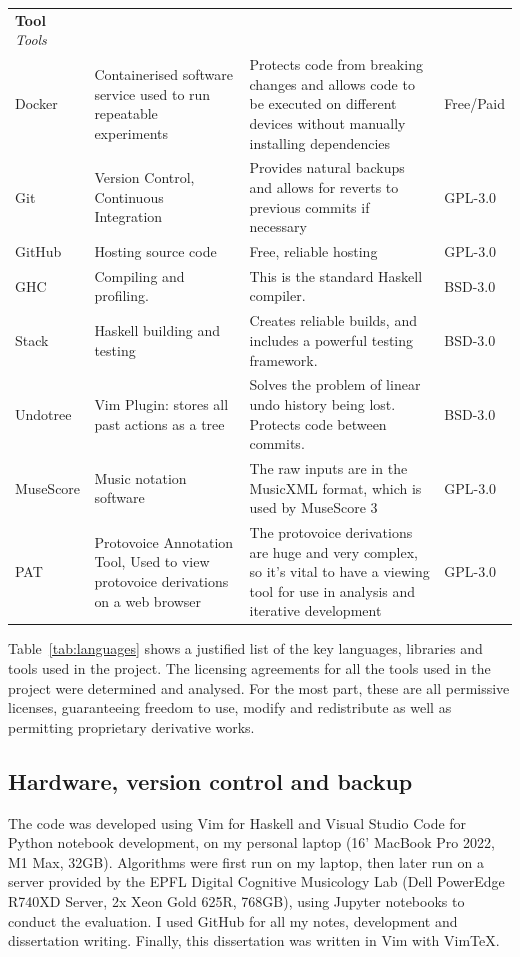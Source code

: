 \documentclass[12pt,a4paper,twoside,openany]{report} \usepackage[pdfborder={0 0 0}]{hyperref}    %
\theoremstyle{definition} \newtheorem{definition}{Definition}[section]
\begin{document}
\begin{table}[ht!]
\begin{tabularx}{\textwidth}{p{4em}X X p{4em}} {\normalsize \textbf{Tool}}
        \textit{Tools} &&&\\ Docker & Containerised software service used to run repeatable experiments
                       & Protects code from breaking changes and allows code to be executed on
        different devices without manually installing dependencies & Free/Paid \\ Git & Version Control, Continuous Integration & Provides natural backups and
        allows for reverts to previous commits if necessary & GPL-3.0 \\ GitHub & Hosting source code & Free, reliable
        hosting & GPL-3.0 \\ GHC & Compiling and profiling. & This is the standard Haskell compiler. & BSD-3.0 \\ Stack
                & Haskell building and testing  & Creates reliable builds, and includes a powerful testing framework.
                & BSD-3.0 \\ Undotree & Vim Plugin: stores all past actions as a tree & Solves the problem of linear
        undo history being lost. Protects code between commits. & BSD-3.0 \\ MuseScore & Music notation software & The
        raw inputs are in the MusicXML format, which is used by MuseScore 3 & GPL-3.0 \\ PAT & Protovoice Annotation
        Tool, Used to view protovoice derivations on a web browser & The protovoice derivations are huge and very
      complex, so it's vital to have a viewing tool for use in analysis and iterative development & GPL-3.0 \\
    \end{tabularx} 
  \end{table}

    Table~\ref{tab:languages} shows a justified list of the key languages, libraries and tools used in the project. The
    licensing agreements for all the tools used in the project were determined and analysed. For the most part, these
    are all permissive licenses, guaranteeing freedom to use, modify and redistribute as well as permitting proprietary
    derivative works. 

    \subsection{Hardware, version control and backup} 
    \label{sub:hardware}
    The code was developed using Vim for Haskell and Visual Studio
    Code for Python notebook development, on my personal laptop (16' MacBook Pro 2022, M1 Max, 32GB). Algorithms
    were first run on my laptop, then later run on a server provided by the EPFL Digital Cognitive Musicology Lab (Dell PowerEdge R740XD Server, 2x Xeon Gold
    625R, 768GB), using Jupyter notebooks to conduct the evaluation. I used GitHub for all my notes, development and
    dissertation writing. Finally, this dissertation was written in Vim with VimTeX.
\end{document}
